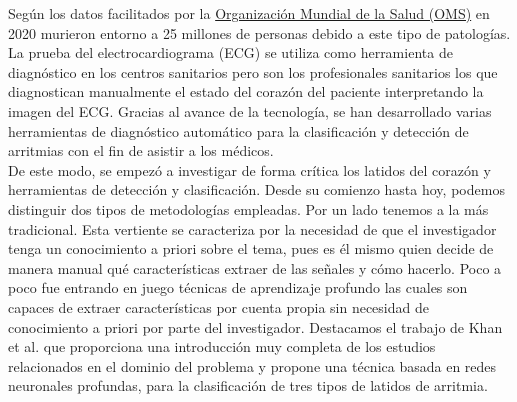     
    Según los datos facilitados por la \href{http://www.who.int/mediacentre/factsheets/fs317/en/.}{Organización Mundial de la Salud (OMS)} en 2020 murieron entorno a 25 millones de personas debido a este tipo de patologías. La prueba del electrocardiograma (ECG) se utiliza como herramienta de diagnóstico en los centros sanitarios pero son los profesionales sanitarios los que diagnostican manualmente el estado del corazón del paciente interpretando la imagen del ECG. Gracias al avance de la tecnología, se han desarrollado varias herramientas de diagnóstico automático para la clasificación y detección de arritmias con el fin de asistir a los médicos.\\
    
    De este modo, se empezó a investigar de forma crítica los latidos del corazón y herramientas de detección y clasificación. Desde su comienzo hasta hoy, podemos distinguir dos tipos de metodologías empleadas. Por un lado tenemos a la más tradicional. Esta vertiente se caracteriza por la necesidad de que el investigador tenga un conocimiento a priori sobre el tema, pues es él mismo quien decide de manera manual qué características extraer de las señales y cómo hacerlo. Poco a poco fue entrando en juego técnicas de aprendizaje profundo las cuales son capaces de extraer características por cuenta propia sin necesidad de conocimiento a priori por parte del investigador. Destacamos el trabajo de Khan et al. \cite{khan2021cardiac} que proporciona una introducción muy completa de los estudios relacionados en el dominio del problema y propone una técnica basada en redes neuronales profundas, para la clasiﬁcación de tres tipos de latidos de arritmia. \\
    
